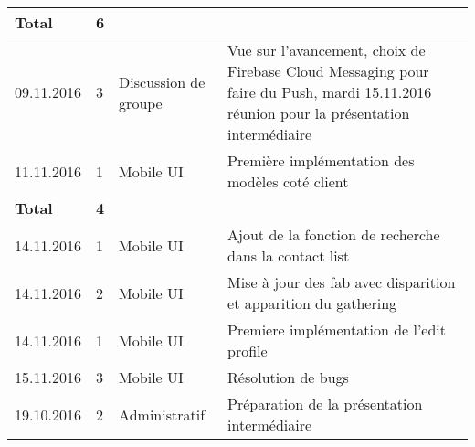 \documentclass[french]{article}
\begin{document}
\begin{longtable}{p{}|p{}|p{}|p{}}
		\textbf{Total} & \textbf{6} &&\\
		\hline
		09.11.2016 & 3 & Discussion de groupe & Vue sur l'avancement, choix de Firebase Cloud Messaging pour faire du Push, mardi 15.11.2016 réunion pour la présentation intermédiaire\\
		11.11.2016 & 1 & Mobile UI & Première implémentation des modèles coté client\\
		\textbf{Total} & \textbf{4} &&\\
		\hline
		14.11.2016 & 1 & Mobile UI & Ajout de la fonction de recherche dans la contact list\\
		14.11.2016 & 2 & Mobile UI & Mise à jour des fab avec disparition et apparition du gathering\\
		14.11.2016 & 1 & Mobile UI & Premiere implémentation de l'edit profile\\
		15.11.2016 & 3 & Mobile UI & Résolution de bugs\\
		19.10.2016 & 2 & Administratif & Préparation de la présentation intermédiaire  \\


\end{longtable}
\end{document}
